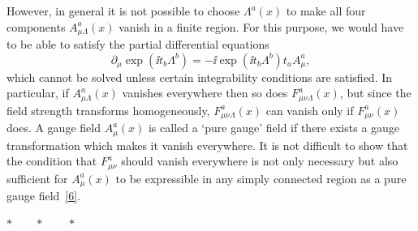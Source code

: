 However, in general it is not possible to choose $\Lambda^a(x)$ to make all
four components $A^a_{\mu\Lambda}(x)$ vanish in a finite region. For this
purpose, we would have to be able to satisfy the partial differential equations
\begin{equation}
 \partial_\mu\exp(\ii t_b\Lambda^b)
 =-\ii\exp(\ii t_b\Lambda^b)t_a A^a_\mu ,
 \tag{15.1.19}\label{eq:15.1.19}
\end{equation}
which cannot be solved unless certain integrability conditions are satisfied. In
particular, if $A^a_{\mu\Lambda}(x)$ vanishes everywhere then so does
$F^a_{\mu\nu\Lambda}(x)$, but since the field strength transforms
homogeneously, $F^a_{\mu\nu\Lambda}(x)$ can vanish only if
$F^a_{\mu\nu}(x)$ does. A gauge field $A^a_\mu(x)$ is called a
`pure gauge' field if there exists a gauge transformation which makes it vanish
everywhere. It is not difficult to show that the condition that
$F^a_{\mu\nu}$ should vanish everywhere is not only necessary but also
sufficient for $A^a_\mu(x)$ to be expressible in any simply connected
region as a pure gauge field~\hyperref[ch15-ref-6]{[6]}.

\begin{center}
$*\qquad *\qquad *$
\end{center}

